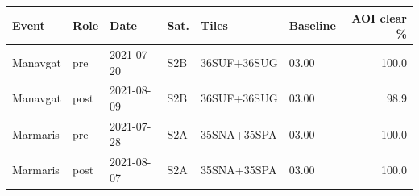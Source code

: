 \begin{tabular}{llllllr}
\toprule
Event & Role & Date & Sat. & Tiles & Baseline & AOI clear \% \\
\midrule
Manavgat & pre & 2021-07-20 & S2B & 36SUF+36SUG & 03.00 & 100.0 \\
Manavgat & post & 2021-08-09 & S2B & 36SUF+36SUG & 03.00 & 98.9 \\
Marmaris & pre & 2021-07-28 & S2A & 35SNA+35SPA & 03.00 & 100.0 \\
Marmaris & post & 2021-08-07 & S2A & 35SNA+35SPA & 03.00 & 100.0 \\
\bottomrule
\end{tabular}
